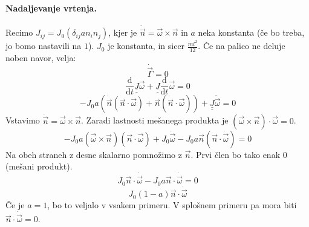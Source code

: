 \documentclass[a4paper]{article}
\newcommand{\vct}[1]{\overrightarrow{#1}}
\newcommand{\dd}[2]{\frac{\mathrm{d} {#1}}{\mathrm{d} {#2}}}
\newcommand{\vw}{\vct{\omega}}
\newcommand{\duline}[1]{\underline{\underline{#1}}}
\begin{document}
\paragraph{Nadaljevanje vrtenja.} Recimo $J_{ij} = J_0(\delta_{ij}an_in_j)$, kjer je $\dot{\vct{n}} = \vw \times \vct{n}$ in $a$ neka konstanta (če bo treba, jo bomo nastavili na $1$). $J_0$ je konstanta, in sicer $\displaystyle{\frac{ml^2}{12}}$. Če na palico ne deluje noben navor, velja:
$$\dot{\vct{\Gamma}} = 0$$
$$\dd{}{t}\duline{J} \vw + \duline{J} \dd{}{t}\vw = 0$$
$$-J_0a(\dot{\vct{n}}(\vct{n}\cdot\vw) + \vct{n}(\dot{\vct{n}}\cdot\vw)) + \duline{J}\dot{\vw} = 0$$
Vstavimo $\dot{\vct{n}} = \vw\times\vct{n}$. Zaradi lastnosti mešanega produkta je $(\vw\times\vct{n})\cdot\vw = 0$.
$$-J_0a (\vw\times\vct{n})(\vct{n}\cdot\vw) + J_0\dot{\vw} - J_0a\vct{n}(\vct{n}\cdot\dot{\vw}) = 0$$
Na obeh straneh z desne skalarno pomnožimo z $\vct{n}$. Prvi člen bo tako enak 0 (mešani produkt).
$$J_0\vct{n}\cdot\dot{\vw} - J_0a\vct{n}\cdot\dot{\vw} = 0$$
$$J_0(1-a)\vct{n}\cdot\dot{\vw}$$
Če je $a = 1$, bo to veljalo v vsakem primeru. V splošnem primeru pa mora biti $\vct{n}\cdot\dot{\vw} = 0$. \newpage
\end{document}
